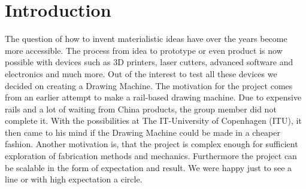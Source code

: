 
\section{Introduction}
The question of how to invent materialistic ideas have over the years become more accessible. The process from idea to prototype or even product is now possible with devices such as 3D printers, laser cutters, advanced software and electronics and much more. Out of the interest to test all these devices we decided on creating a Drawing Machine. The motivation for the project comes from an earlier attempt to make a rail-based drawing machine. Due to expensive rails and a lot of waiting from China products, the group member did not complete it. With the possibilities at The IT-University of Copenhagen (ITU), it then came to his mind if the Drawing Machine could be made in a cheaper fashion. Another motivation is, that the project is complex enough for sufficient exploration of fabrication methods and mechanics. Furthermore the project can be scalable in the form of expectation and result. We were happy just to see a line or with high expectation a circle.  

